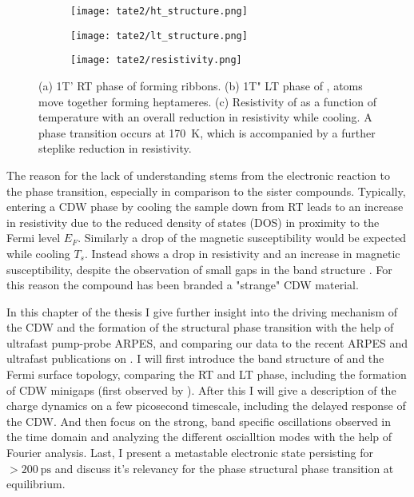 \begin{figure}
	\centering
	\begin{subfigure}[b]{0.3\textwidth}
		\texttt{[image: tate2/ht\_structure.png]}
	\end{subfigure}
	\hfill
	\begin{subfigure}[b]{0.3\textwidth}
		\texttt{[image: tate2/lt\_structure.png]}
	\end{subfigure}
	\hfill
	\begin{subfigure}[b]{0.3\textwidth}
		\texttt{[image: tate2/resistivity.png]}
	\end{subfigure}
	\caption{(a) 1T' RT phase of  forming ribbons. (b) 1T" LT phase of ,  atoms move together forming heptameres. (c) Resistivity of  as a function of temperature with an overall reduction in resistivity while cooling. A phase transition occurs at \SI{170}{\kelvin}, which is accompanied by a further steplike reduction in resistivity.}
	\label{fig:tate_structure}
\end{figure}


The reason for the lack of understanding stems from the electronic reaction to the phase transition, especially in comparison to the  sister compounds.
Typically, entering a CDW phase by cooling the sample down from RT leads to an increase in resistivity due to the reduced density of states (DOS) in proximity to the Fermi level $E_F$.
Similarly a drop of the magnetic susceptibility would be expected while cooling $T_s$.
Instead  shows a drop in resistivity and an increase in magnetic susceptibility, despite the observation of small gaps in the band structure \cite{sorgel_new_2006,hu_optical_2022,lin_evidence_2022}.
For this reason the compound has been branded a "strange" CDW material.

In this chapter of the thesis I give further insight into the driving mechanism of the CDW and the formation of the structural phase transition with the help of ultrafast pump-probe ARPES, and comparing our data to the recent ARPES and ultrafast publications on .
I will first introduce the band structure of  and the Fermi surface topology, comparing the RT and LT phase, including the formation of CDW minigaps (first observed by \cite{lin_evidence_2022}).
After this I will give a description of the charge dynamics on a few picosecond timescale, including the delayed response of the CDW.
And then focus on the strong, band specific oscillations observed in the time domain and analyzing the different oscialltion modes with the help of Fourier analysis.
Last, I present a metastable electronic state persisting for $>\SI{200}{\pico\second}$ and discuss it's relevancy for the phase structural phase transition at equilibrium.

